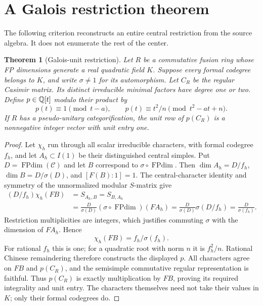 \documentclass[11pt,a4paper]{article}
\newtheorem{theorem}{Theorem}[section]\newtheorem{proposition}[theorem]{Proposition}
\theoremstyle{remark}\newtheorem{remark}[theorem]{Remark}
\newcommand{\FPdim}{\operatorname{FPdim}}\newcommand{\Rep}{\operatorname{Rep}}
\begin{document}
\section{A Galois restriction theorem}\label{sec:galois}
The following criterion reconstructs an entire central restriction from the
source algebra. It does not enumerate the rest of the center.
\begin{theorem}[Galois-unit restriction]
Let $R$ be a commutative fusion ring whose FP dimensions generate a real
quadratic field $K$. Suppose every formal codegree belongs to $K$, and
write $\sigma\ne1$ for its automorphism. Let $C_R$ be the regular Casimir
matrix. Its distinct irreducible minimal factors have degree one or two.
Define $p\in\mathbb Q[t]$ modulo their product by
\[
 p(t)\equiv1\pmod{t-a},\qquad
 p(t)\equiv t^2/n\pmod{t^2-at+n}.
\]
If $R$ has a pseudo-unitary categorification, the unit row of $p(C_R)$ is
a nonnegative integer vector with unit entry one.
\end{theorem}
\begin{proof}
Let $\chi_h$ run through all scalar irreducible characters, with formal
codegree $f_h$, and let $A_h\subset I(1)$ be their distinguished central
simples. Put $D=\FPdim(\mathcal C)$ and let $B$ correspond to
$\sigma\circ\FPdim$. Then
$\dim A_h=D/f_h$, $\dim B=D/\sigma(D)$, and $[F(B):1]=1$.
The central-character identity and symmetry of the unnormalized modular
$S$-matrix \cite{Deshpande} give
\begin{align*}
 (D/f_h)\chi_h(FB)&=S_{A_h,B}=S_{B,A_h}\\
 &=\frac{D}{\sigma(D)}(\sigma\circ\FPdim)(F A_h)
 =\frac{D}{\sigma(D)}\sigma(D/f_h)
 =\frac{D}{\sigma(f_h)}.
\end{align*}
Restriction multiplicities are integers, which justifies commuting
$\sigma$ with the dimension of $F A_h$. Hence
\[
 \chi_h(FB)=f_h/\sigma(f_h).
\]
For rational $f_h$ this is one; for a quadratic root with norm $n$ it is
$f_h^2/n$. Rational Chinese remaindering therefore constructs the displayed
$p$. All characters agree on $FB$ and $p(C_R)$, and the semisimple
commutative regular representation is faithful. Thus $p(C_R)$ is exactly
multiplication by $FB$, proving its required integrality and unit entry.
The characters themselves need not take their values in $K$; only their
formal codegrees do.
\end{proof}
\end{document}
